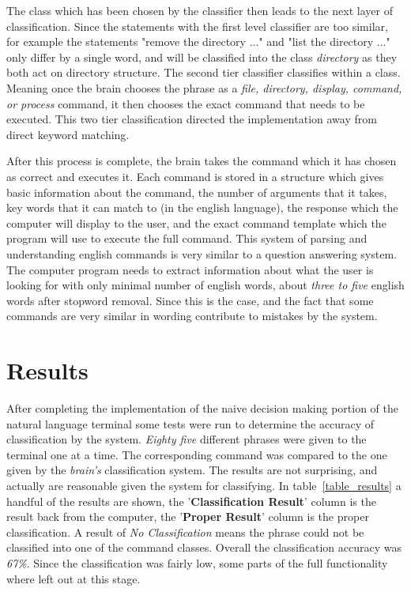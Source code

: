 \documentclass[12pt]{article}
\begin{document}
The class which has been chosen by the classifier then leads to the next layer of classification. Since the statements with the first level classifier are too similar, for example the statements "remove the directory ..." and "list the directory ..." only differ by a single word, and will be classified into the class {\it directory} as they both act on directory structure. The second tier classifier classifies within a class. Meaning once the brain chooses the phrase as a {\it file, directory, display, command, or process} command, it then chooses the exact command that needs to be executed. This two tier classification directed the implementation away from direct keyword matching.

After this process is complete, the brain takes the command which it has chosen as correct and executes it. Each command is stored in a structure which gives basic information about the command, the number of arguments that it takes, key words that it can match to (in the english language), the response which the computer will display to the user, and the exact command template which the program will use to execute the full command. This system of parsing and understanding english commands is very similar to a question answering system.\cite{aggarwal} The computer program needs to extract information about what the user is looking for with only minimal number of english words, about {\it three to five} english words after stopword removal. Since this is the case, and the fact that some commands are very similar in wording contribute to mistakes by the system.

\section{Results}
\label{Results}

After completing the implementation of the naive decision making portion of the natural language terminal some tests were run to determine the accuracy of classification by the system. {\it Eighty five} different phrases were given to the terminal one at a time. The corresponding command was compared to the one given by the {\it brain's} classification system. The results are not surprising, and actually are reasonable given the system for classifying. In table~\ref{table_results} a handful of the results are shown, the '\textbf{Classification Result}' column is the result back from the computer, the '\textbf{Proper Result}' column is the proper classification. A result of {\it No Classification} means the phrase could not be classified into one of the command classes. Overall the classification accuracy was {\it 67\%}. Since the classification was fairly low, some parts of the full functionality where left out at this stage.
\end{document}
